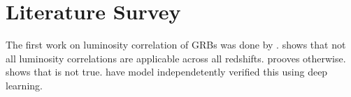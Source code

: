 \section{Literature Survey}
The first work on luminosity correlation of GRBs was done by \cite{schaefer2007hubble}. \cite{li2007variation} shows that not all luminosity correlations are applicable across all redshifts. \cite{basilakos2008testing} prooves otherwise. \cite{wang2011updated} shows that is not true. \cite{tang2021model} have model independetently verified this using deep learning.
